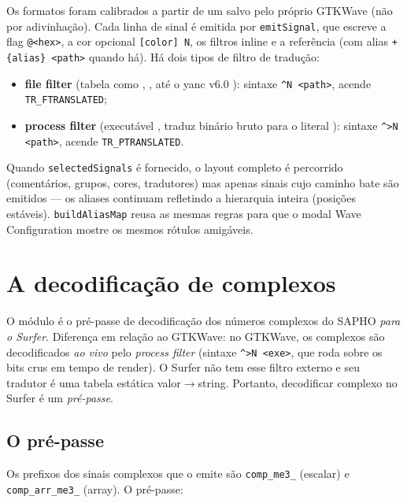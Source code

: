 Os formatos foram calibrados a partir de um  salvo pelo próprio
GTKWave (não por adivinhação). Cada linha de sinal é emitida por
\lstinline|emitSignal|, que escreve a flag \lstinline|@<hex>|, a cor opcional
\lstinline|[color] N|, os filtros inline e a referência (com alias
\lstinline|+{alias} <path>| quando há). Há dois tipos de filtro de tradução:

\begin{itemize}[leftmargin=*]
  \item \textbf{file filter} (tabela  como ,
    , até o yanc v6.0 ): sintaxe \lstinline|^N <path>|, acende
    \lstinline|TR_FTRANSLATED|;
  \item \textbf{process filter} (executável , traduz binário
    bruto para o literal \cmm{}): sintaxe \lstinline|^>N <path>|, acende
    \lstinline|TR_PTRANSLATED|.
\end{itemize}

Quando \lstinline|selectedSignals| é fornecido, o layout completo é percorrido
(comentários, grupos, cores, tradutores) mas apenas sinais cujo caminho bate são
emitidos --- os aliases continuam refletindo a hierarquia inteira (posições
estáveis). \lstinline|buildAliasMap| reusa as mesmas regras para que o modal
Wave Configuration mostre os mesmos rótulos amigáveis.

\section{A decodificação de complexos}

O módulo  é o pré-passe de decodificação dos
números complexos do SAPHO \emph{para o Surfer}. Diferença em relação ao
GTKWave: no GTKWave, os complexos são decodificados \emph{ao vivo} pelo
\emph{process filter}  (sintaxe \lstinline|^>N <exe>|, que
roda sobre os bits crus em tempo de render). O Surfer não tem esse filtro
externo e seu tradutor é uma tabela estática valor$\rightarrow$string. Portanto,
decodificar complexo no Surfer é um \emph{pré-passe}.

\subsection{O pré-passe}

Os prefixos dos sinais complexos que o  emite são
\lstinline|comp_me3_| (escalar) e \lstinline|comp_arr_me3_| (array). O pré-passe:

